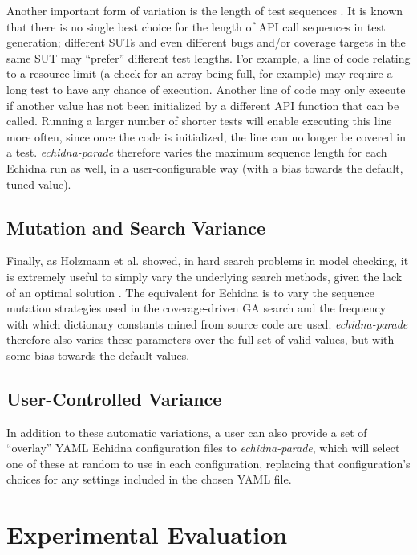 \documentclass[sigconf]{acmart}
\begin{document}
{Another important form of variation is the length of test sequences \cite{ASE08,ArcuriLen}.  It is
known that there is no single best choice for the length of API call
sequences in test generation; different SUTs and even different bugs
and/or coverage targets in the same SUT may ``prefer'' different test
lengths.  For example, a line of code relating to a resource limit (a
check for an array being full, for example) may require a long test to
have any chance of execution.  Another line of code may only execute
if another value has not been initialized by a different API function
that can be called.  Running a larger number of shorter tests will enable executing
this line more often, since once the code is initialized, the line can
no longer be covered in a test.  \emph{echidna-parade} therefore
varies the maximum sequence length for each Echidna run as well, in a
user-configurable way (with a bias towards the default, tuned value).

\subsection{Mutation and Search Variance}

Finally, as Holzmann et al. showed, in hard search problems in model
checking, it is extremely useful to simply vary the underlying search
methods, given the lack of an optimal solution \cite{swarmIEEE}.  The
equivalent for Echidna is to vary the sequence mutation strategies
used in the coverage-driven GA search and the frequency with which
dictionary constants mined from source code are used.
\emph{echidna-parade} therefore also varies these parameters over the
full set of valid values, but with some bias towards the default values.

\subsection{User-Controlled Variance}

In addition to these automatic variations, a user can also provide a
set of ``overlay'' YAML Echidna configuration files to
\emph{echidna-parade}, which will select one of these at random to use
in each configuration, replacing that configuration's choices for any
settings included in the chosen YAML file.

\section{Experimental Evaluation}

}
\end{document}
